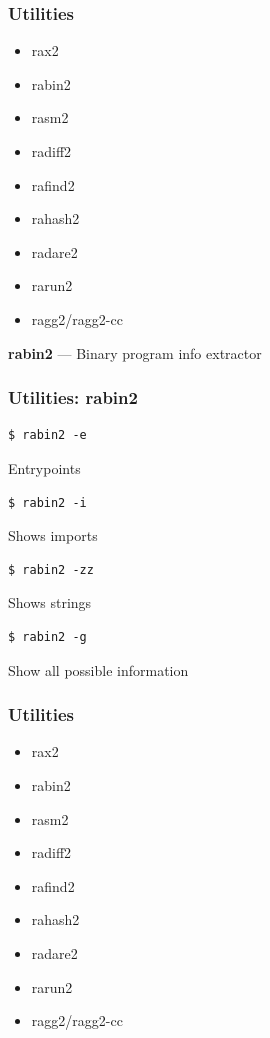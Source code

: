 \documentclass[10pt, compress]{beamer}
\begin{document}
\begin{frame}[fragile]
  \frametitle{Utilities}
     \begin{itemize}
        \item rax2
        \item \alert{rabin2}
        \item rasm2
        \item radiff2
        \item rafind2
        \item rahash2
        \item radare2
        \item rarun2
        \item ragg2/ragg2-cc
      \end{itemize}
\end{frame}

\begin{frame}[fragile]
  \center\textbf{rabin2} — Binary program info extractor
  \noindent\makebox[\linewidth]{\rule{\paperwidth}{0.4pt}}
  \frametitle{Utilities: rabin2}
  \begin{verbatim}$ rabin2 -e\end{verbatim}
  \alert{Entrypoints}
  \begin{verbatim}$ rabin2 -i\end{verbatim}
  \alert{Shows imports}
  \begin{verbatim}$ rabin2 -zz\end{verbatim}
  \alert{Shows strings}
  \begin{verbatim}$ rabin2 -g\end{verbatim}
  \alert{Show all possible information}

\end{frame}

\begin{frame}[fragile]
  \frametitle{Utilities}
     \begin{itemize}
        \item rax2
        \item rabin2
        \item \alert{rasm2}
        \item radiff2
        \item rafind2
        \item rahash2
        \item radare2
        \item rarun2
        \item ragg2/ragg2-cc
      \end{itemize}
\end{frame}
\end{document}

